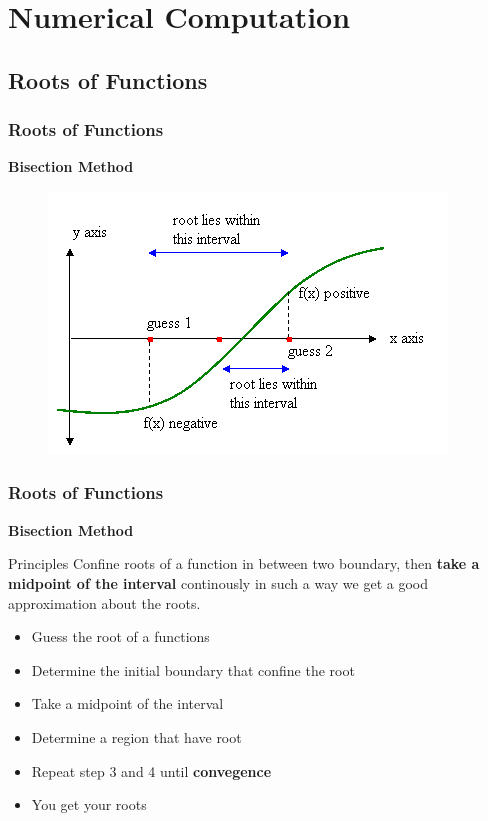 \documentclass{beamer}
\begin{document}
\section{Numerical Computation}
\subsection{Roots of Functions}
\begin{frame}
\frametitle{Roots of Functions}
\textbf{Bisection Method}
\begin{figure}
\centering
\includegraphics[scale=0.5]{Bisection.png}
\end{figure}
\end{frame}


\begin{frame}
\frametitle{Roots of Functions}
\textbf{Bisection Method}
\begin{block}{Principles}
Confine roots of a function in between two boundary, then \textbf{take a midpoint of the interval} continously in such a way we get a good approximation about the roots. 
\end{block}

\begin{itemize}
\item Guess the root of a functions
\item Determine the initial boundary that confine the root
\item Take a midpoint of the interval
\item Determine a region that have root
\item Repeat step 3 and 4 until \textbf{convegence}
\item You get your roots 
\end{itemize}
\end{frame}
\end{document}

